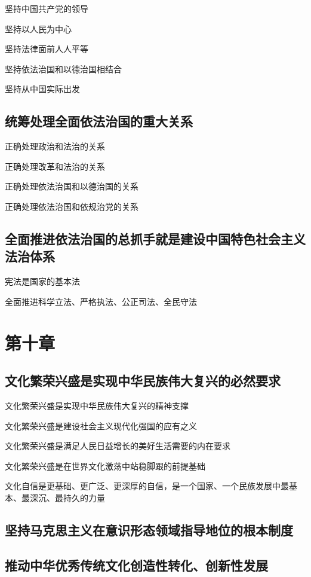 \documentclass[11pt, a4paper]{article}
\begin{document}
坚持中国共产党的领导

坚持以人民为中心

坚持法律面前人人平等

坚持依法治国和以德治国相结合

坚持从中国实际出发

\subsection*{统筹处理全面依法治国的重大关系}

正确处理政治和法治的关系

正确处理改革和法治的关系

正确处理依法治国和以德治国的关系

正确处理依法治国和依规治党的关系

\subsection*{全面推进依法治国的总抓手就是建设中国特色社会主义法治体系}

宪法是国家的基本法

全面推进科学立法、严格执法、公正司法、全民守法

\section*{第十章}

\subsection*{文化繁荣兴盛是实现中华民族伟大复兴的必然要求}

文化繁荣兴盛是实现中华民族伟大复兴的精神支撑

文化繁荣兴盛是建设社会主义现代化强国的应有之义

文化繁荣兴盛是满足人民日益增长的美好生活需要的内在要求

文化繁荣兴盛是在世界文化激荡中站稳脚跟的前提基础

文化自信是更基础、更广泛、更深厚的自信，是一个国家、一个民族发展中最基本、最深沉、最持久的力量

\subsection*{坚持马克思主义在意识形态领域指导地位的根本制度}

\subsection*{推动中华优秀传统文化创造性转化、创新性发展}
\end{document}
